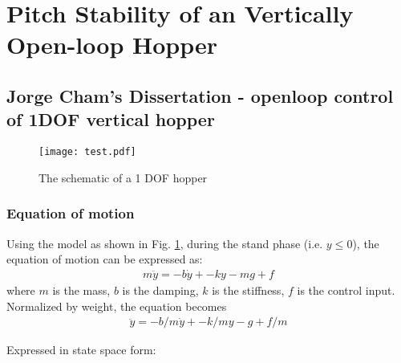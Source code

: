 \section{Pitch Stability of an Vertically Open-loop Hopper}

\subsection{Jorge Cham's Dissertation - openloop control of 1DOF vertical hopper }
\begin{figure}[h]
\centering

\texttt{[image: test.pdf]} 
\caption{The schematic of a 1 DOF hopper \cite{Cham2002}}
\label{fig.1DOF-Hopper}
\end{figure}


\subsubsection{Equation of motion}
Using the model as shown in Fig. \ref{fig.1DOF-Hopper}, during the stand phase (i.e. $y\leq 0$), the equation of motion can be expressed as:
\begin{align*}
m \ddot y = -b\dot y +-ky -mg + f
\end{align*}
\noindent where $m$ is the mass, $b$ is the damping, $k$ is the stiffness, $f$ is the control input.
Normalized by weight, the equation becomes
\begin{align*}
 \ddot y = -b/m\dot y +-k/my -g + f/m
\end{align*}

\noindent Expressed in state space form:

